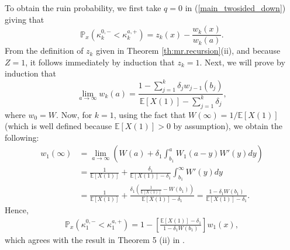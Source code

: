 \documentclass[12pt,reqno]{amsart}
\theoremstyle{definition}
\theoremstyle{remark}
\begin{document}
To obtain the ruin probability, we first take $q=0$ in (\ref{main_twosided_down}) giving
that 
\begin{equation}\label{eq:ruin.k}
\mathbb{P}_x(\kappa_k^{0,-}<\kappa_k^{a,+})=z_k(x)-\frac{w_k(x)}{w_k(a)}.
\end{equation} 
From the definition of $z_k$ given in Theorem \ref{th:mr.recursion}(ii), and because $Z=1$, it follows immediately by induction that $z_k=1$. 
Next, we will prove by induction that
	\begin{equation}\label{lim_ruin_prob}\lim_{a\to \infty} w_k(a)= \frac{1-\sum_{j=1}^{k} \delta_j w_{j-1}(b_j)}{\mathbb{E}[X(1)]-\sum_{j=1}^k\delta_j} ,\end{equation}
	where $w_0=W$.
	Now, for $k=1$, using the fact that $W(\infty)=1/\mathbb{E}[X(1)]$ (which is well defined because $\mathbb{E}[X(1)] > 0$ by assumption), 
	we obtain the following:
	\begin{align*}
	w_1(\infty)&=\lim_{a\to \infty}\left(W(a)+ \delta_1 \int_{b_1}^{a} W_1(a-y) W'(y) dy \right)\\ &= \frac{1}{\mathbb{E}[X(1)]}+\frac{\delta_1}{\mathbb{E}[X(1)]-\delta_1}  \int_{b_1}^{\infty}W'(y) dy \\ &= \frac{1}{\mathbb{E}[X(1)]}+\frac{\delta_1\left(\frac{1}{\mathbb{E}[X(1)]}-W(b_1)\right)}{\mathbb{E}[X(1)]-\delta_1} =\frac{1-\delta_1 W(b_1)}{\mathbb{E}[X(1)]-\delta_1}.
	\end{align*}
	Hence,
	\begin{align*}
	\mathbb{P}_x(\kappa_1^{0,-}<\kappa_1^{a,+})=1-\left[\frac{\mathbb{E}[X(1)]-\delta_1}{1-\delta_{1}W(b_{1})}\right]w_1(x),
	\end{align*}
	which agrees with the result in Theorem 5 (ii) in \cite{kyprianouloeffen2010}.
\end{document}
